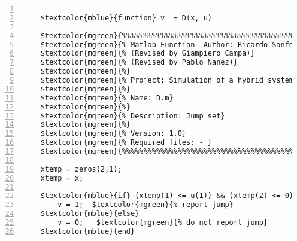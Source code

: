 %  
%  
%  
%  
  
  
\DefineShortVerb[fontfamily=courier,fontseries=m]{\$} 
\DefineShortVerb[fontfamily=courier,fontseries=b]{\#} 
  
\begin{Verbatim}[commandchars=\$\{\},numbers=left,numbersep=2pt] 

    $textcolor{mblue}{function} v  = D(x, u)  
     
    $textcolor{mgreen}{%%%%%%%%%%%%%%%%%%%%%%%%%%%%%%%%%%%%%%%%%%%%%%%%%%%%%%%%%%%%%%%%%%%%%%%%%%%} 
    $textcolor{mgreen}{% Matlab Function  Author: Ricardo Sanfelice } 
    $textcolor{mgreen}{% (Revised by Giampiero Campa)} 
    $textcolor{mgreen}{% (Revised by Pablo Nanez)} 
    $textcolor{mgreen}{%} 
    $textcolor{mgreen}{% Project: Simulation of a hybrid system (Bouncing ball)} 
    $textcolor{mgreen}{%} 
    $textcolor{mgreen}{% Name: D.m} 
    $textcolor{mgreen}{%} 
    $textcolor{mgreen}{% Description: Jump set} 
    $textcolor{mgreen}{%} 
    $textcolor{mgreen}{% Version: 1.0} 
    $textcolor{mgreen}{% Required files: - } 
    $textcolor{mgreen}{%%%%%%%%%%%%%%%%%%%%%%%%%%%%%%%%%%%%%%%%%%%%%%%%%%%%%%%%%%%%%%%%%%%%%%%%%%%} 
     
    xtemp = zeros(2,1); 
    xtemp = x; 
     
    $textcolor{mblue}{if} (xtemp(1) <= u(1)) && (xtemp(2) <= 0)  $textcolor{mgreen}{% jump condition} 
        v = 1;  $textcolor{mgreen}{% report jump} 
    $textcolor{mblue}{else} 
        v = 0;   $textcolor{mgreen}{% do not report jump} 
    $textcolor{mblue}{end}  
\end{Verbatim}  
  
\UndefineShortVerb{\$} 
\UndefineShortVerb{\#} 
 